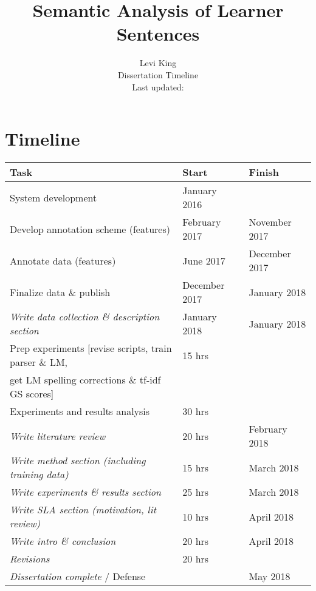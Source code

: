 \documentclass[11pt]{article}
\title{Semantic Analysis of Learner Sentences}
\author{Levi King \\ Dissertation Timeline \\ Last updated: \\}
\begin{document}
\maketitle

\section{Timeline}
\begin{center}
\begin{tabular}{|l|l|l|}
  \hline
  \textbf{Task} & \textbf{Start} & \textbf{Finish} \\
  \hline
  \hline
  System development & January 2016 &  \\
  \hline
  Develop annotation scheme (features) & February 2017 & November 2017 \\
  \hline
  Annotate data (features) & June 2017 & December 2017 \\
  \hline
  Finalize data \& publish & December 2017 & January 2018 \\
  \hline
  \textit{Write data collection \& description section} & January 2018 & January 2018 \\
  \hline
  Prep experiments [revise scripts, train parser \& LM, & 15 hrs & \\ 
  get LM spelling corrections \& tf-idf GS scores] & & \\
  \hline
  Experiments and results analysis & 30 hrs &  \\
  \hline
  \textit{Write literature review} & 20 hrs & February 2018 \\
  \hline
  \textit{Write method section (including training data)} & 15 hrs & March 2018 \\
  \hline
  \textit{Write experiments \& results section} & 25 hrs & March 2018 \\  \hline
  \textit{Write SLA section (motivation, lit review)} & 10 hrs & April 2018 \\
  \hline
  \textit{Write intro \& conclusion} & 20 hrs & April 2018 \\
  \hline
  \textit{Revisions} & 20 hrs & \\
  \hline
  \textit{Dissertation complete} / Defense & & May 2018 \\
  \hline
\end{tabular}
\end{center}
\end{document}
